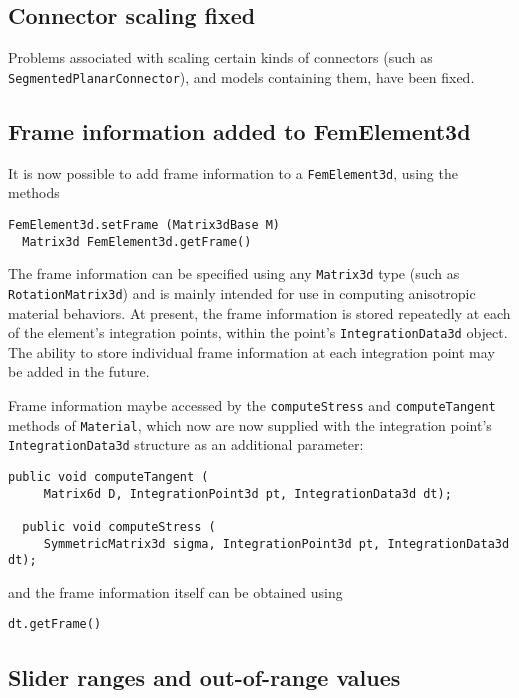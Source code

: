 \documentclass{article}
\begin{document}
\subsection*{Connector scaling fixed}

Problems associated with scaling certain kinds of connectors (such as
{\tt SegmentedPlanarConnector}), and models containing them, have been fixed.

\subsection*{Frame information added to FemElement3d}

It is now possible to add frame information to a {\tt FemElement3d},
using the methods

\begin{lstlisting}[]
  FemElement3d.setFrame (Matrix3dBase M)
  Matrix3d FemElement3d.getFrame()
\end{lstlisting}

The frame information can be specified using any {\tt Matrix3d} type (such
as {\tt RotationMatrix3d}) and is mainly intended for use in computing
anisotropic material behaviors. At present, the frame information is
stored repeatedly at each of the element's integration points, within
the point's {\tt IntegrationData3d} object. The ability to store individual frame
information at each integration point may be added in the
future.

Frame information maybe accessed by the {\tt computeStress} and
{\tt computeTangent} methods of {\tt Material}, which now are now supplied
with the integration point's {\tt IntegrationData3d} structure as an
additional parameter:

\begin{lstlisting}[]
  public void computeTangent (
     Matrix6d D, IntegrationPoint3d pt, IntegrationData3d dt);
  
  public void computeStress (
     SymmetricMatrix3d sigma, IntegrationPoint3d pt, IntegrationData3d dt);  
\end{lstlisting}

and the frame information itself can be obtained using

\begin{lstlisting}[]
  dt.getFrame()
\end{lstlisting}
 
\subsection*{Slider ranges and out-of-range values}
\end{document}

